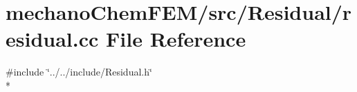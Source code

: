 \section{mechano\-Chem\-F\-E\-M/src/\-Residual/residual.cc File Reference}
\label{residual_8cc}
{\ttfamily \#include \char`\"{}../../include/\-Residual.\-h\char`\"{}}\\*
